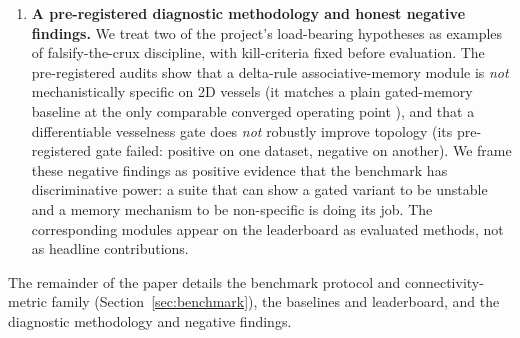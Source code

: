 \begin{enumerate}
  \item \textbf{A pre-registered diagnostic methodology and honest negative
        findings.} We treat two of the project's load-bearing hypotheses as
        examples of falsify-the-crux discipline, with kill-criteria fixed
        before evaluation. The pre-registered audits show that a delta-rule
        associative-memory module is \emph{not} mechanistically specific on
        2D vessels (it matches a plain gated-memory baseline at the only
        comparable converged operating point ), and that a differentiable vesselness gate
        does \emph{not} robustly improve topology (its pre-registered gate
        failed: positive on one dataset, negative on another). We frame these
        negative findings as positive evidence that the benchmark has
        discriminative power: a suite that can show a gated variant to be
        unstable and a memory mechanism to be non-specific is doing its job.
        The corresponding modules appear on the leaderboard as evaluated
        methods, not as headline contributions.
\end{enumerate}

\noindent The remainder of the paper details the benchmark protocol and
connectivity-metric family (Section~\ref{sec:benchmark}), the baselines and
leaderboard, and the diagnostic methodology and negative findings.

